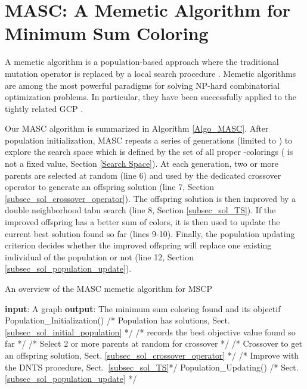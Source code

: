 \documentclass{elsart}
\begin{document}
\section{MASC: A Memetic Algorithm for Minimum Sum Coloring}
\label{Sec_Approach}

A memetic algorithm is a population-based approach where the traditional mutation operator is replaced by a local search procedure \cite{Moscato&Cotta2003,Neri&al2012}. Memetic algorithms are among the most powerful paradigms for solving NP-hard combinatorial optimization problems. In particular, they have been successfully applied to the tightly related GCP \cite{Galinier&Hao1999,Lu&Hao2010,Malaguti&al2008,Porumbel&al2010}.

Our MASC algorithm is summarized in Algorithm \ref{Algo_MASC}. After population initialization, MASC repeats a series of generations (limited to ) to explore the search space which is defined by the set of all proper -colorings ( is not a fixed value, Section \ref{Search Space}). At each generation, two or more parents are selected at random (line 6) and used by the dedicated crossover operator to generate an offspring solution (line 7, Section \ref{subsec_sol_crossover_operator}). The offspring solution is then improved by a double neighborhood tabu search (line 8, Section \ref{subsec_sol_TS}). If the improved offspring has a better sum of colors, it is then used to update the current best solution found so far (lines 9-10). Finally, the population updating criterion decides whether the improved offspring will replace one existing individual of the population or not (line 12, Section \ref{subsec_sol_population_update}).

\begin{algorithm}\footnotesize
\caption{An overview of the MASC memetic algorithm for MSCP}\label{Algo_MASC}
\begin{algorithmic}[1]
\STATE \textbf{input}: A graph 
   \STATE \textbf{output}: The minimum sum coloring  found and its objectif  
   \STATE Population\_Initialization() /* Population  has  solutions, Sect. \ref{subsec_sol_initial_population} */
   \STATE  /*  records the best objective value found so far */
       \STATE  /* Select 2 or more parents at random for crossover */
        \STATE  /* Crossover to get an offspring solution, Sect. \ref{subsec_sol_crossover_operator} */
        \STATE 
        		/* Improve  with the DNTS procedure, Sect.~\ref{subsec_sol_TS}*/
        \IF{}
           \STATE 
        \ENDIF
        \STATE Population\_Updating() /* Sect. \ref{subsec_sol_population_update} */ 
   \ENDFOR
   \RETURN 
\end{algorithmic}
\end{algorithm}
\end{document}
